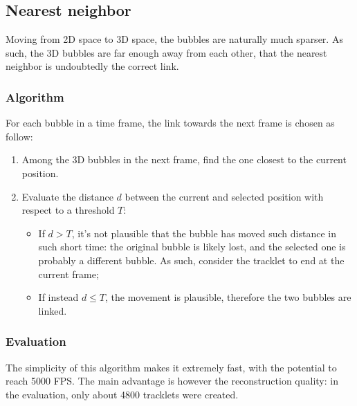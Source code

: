 \subsection{Nearest neighbor}
\label{sec:link3d:NN}

Moving from 2D space to 3D space, the bubbles are naturally much sparser.
As such, the 3D bubbles are far enough away from each other, that the nearest neighbor is undoubtedly the correct link.

\subsubsection{Algorithm}

For each bubble in a time frame, the link towards the next frame is chosen as follow:
\begin{enumerate}
	\itemsep 0em
	\item Among the 3D bubbles in the next frame, find the one closest to the current position.
	\item Evaluate the distance $d$ between the current and selected position with respect to a threshold $T$:
	      \begin{itemize}
		      \item If $d>T$, it's not plausible that the bubble has moved such distance in such short time: the original bubble is likely lost, and the selected one is probably a different bubble. As such, consider the tracklet to end at the current frame;
		      \item If instead $d\le T$, the movement is plausible, therefore the two bubbles are linked.
	      \end{itemize}
\end{enumerate}

\subsubsection{Evaluation}

The simplicity of this algorithm makes it extremely fast, with the potential to reach 5000 FPS.
The main advantage is however the reconstruction quality: in the evaluation, only about 4800 tracklets were created.
